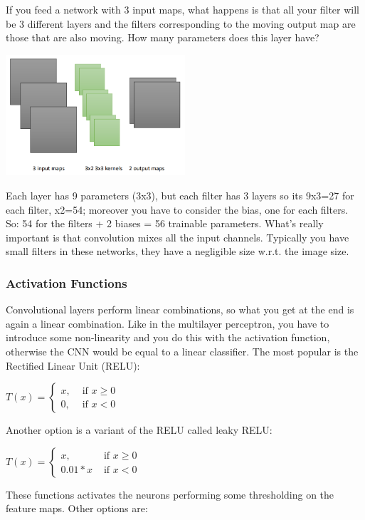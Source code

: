 If you feed a network with 3 input maps, what happens is that all your filter will be 3 different layers and the filters corresponding to the moving output map are those that are also moving. How many parameters does this layer have?
\begin{center}
    \includegraphics[width=0.5\textwidth]{images_CNN/layers.PNG}\par
\end{center}
Each layer has 9 parameters (3x3), but each filter has 3 layers so its 9x3=27 for each filter, x2=54; moreover you have to consider the bias, one for each filters. So: 54 for the filters + 2 biases = 56 trainable parameters. What's really important is that convolution mixes all the input channels. Typically you have small filters in these networks, they have a negligible size w.r.t. the image size.

\subsubsection{Activation Functions}
Convolutional layers perform linear combinations, so what you get at the end is again a linear combination. Like in the multilayer perceptron, you have to introduce some non-linearity and you do this with the activation function, otherwise the CNN would be equal to a linear classifier. The most popular is the Rectified Linear Unit (RELU):
\begin{center}
    $T(x)=\left\{\begin{array}{ll}{x,} & {\text { if } x \geq 0} \\ {0,} & {\text { if } x<0}\end{array}\right.$
\end{center}
Another option is a variant of the RELU called leaky RELU:
\begin{center}
    $T(x)=\left\{\begin{array}{ll}{x,} & {\text { if } x \geq 0} \\ {0.01 * x} & {\text { if } x<0}\end{array}\right.$
\end{center}
These functions activates the neurons performing some thresholding on the feature maps. Other options are:


